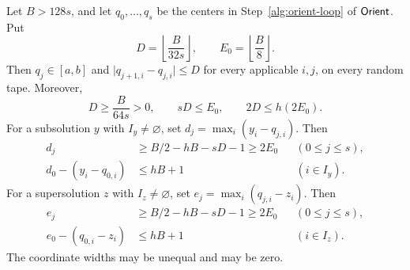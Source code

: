 \begin{lemma}
\label{ori:center-estimates}
Let \(B>128s\), and let \(q_0,\ldots,q_s\) be the centers in
Step~\ref{alg:orient-loop} of \(\mathsf{Orient}\). Put
\[
  D=\left\lfloor\frac{B}{32s}\right\rfloor,
  \qquad
  E_0=\left\lfloor\frac B8\right\rfloor.
\]
Then \(q_j\in[a,b]\) and
\(\lvert q_{j+1,i}-q_{j,i}\rvert\leq D\) for every applicable
\(i,j\), on every random tape. Moreover,
\begin{equation}
\label{ori:radius-estimates}
  D\geq\frac{B}{64s}>0,
  \qquad
  sD\leq E_0,
  \qquad
  2D\leq h(2E_0).
\end{equation}
For a subsolution \(y\) with \(I_y\ne\varnothing\), set
\(d_j=\max_i(y_i-q_{j,i})\). Then
\begin{align}
  d_j&\geq B/2-hB-sD-1\geq 2E_0
       &&(0\leq j\leq s), \label{ori:positive-deviation}\\
  d_0-(y_i-q_{0,i})&\leq hB+1
       &&(i\in I_y). \label{ori:positive-deficit}
\end{align}
For a supersolution \(z\) with \(I_z\ne\varnothing\), set
\(e_j=\max_i(q_{j,i}-z_i)\). Then
\begin{align}
  e_j&\geq B/2-hB-sD-1\geq 2E_0
       &&(0\leq j\leq s), \label{ori:negative-deviation}\\
  e_0-(q_{0,i}-z_i)&\leq hB+1
       &&(i\in I_z). \label{ori:negative-deficit}
\end{align}
The coordinate widths may be unequal and may be zero.
\end{lemma}

